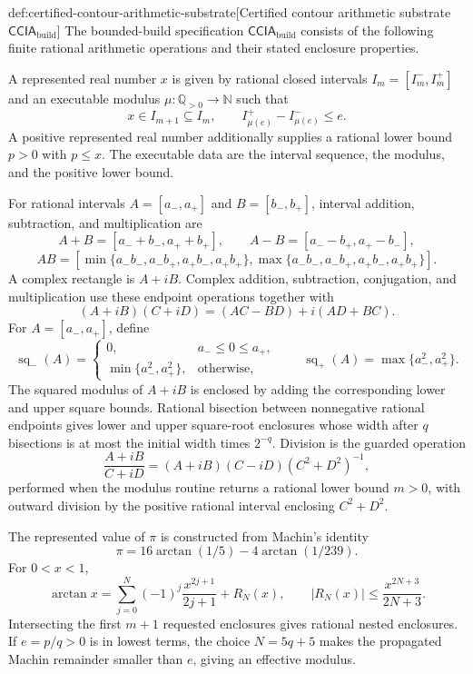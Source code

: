 \documentclass[11pt]{article}
\begin{document}
\begin{definitionv}{def:certified-contour-arithmetic-substrate}[Certified contour arithmetic substrate \(\mathsf{CCIA}_{\mathrm{build}}\)]
The bounded-build specification \(\mathsf{CCIA}_{\mathrm{build}}\) consists of the following finite rational arithmetic operations and their stated enclosure properties.

A represented real number \(x\) is given by rational closed intervals \(I_m=[I_m^-,I_m^+]\) and an executable modulus \(\mu:\mathbb Q_{>0}\to\mathbb N\) such that
\[
x\in I_{m+1}\subseteq I_m,
\qquad
I_{\mu(e)}^+-I_{\mu(e)}^-\le e .
\]
A positive represented real number additionally supplies a rational lower bound \(p>0\) with \(p\le x\). The executable data are the interval sequence, the modulus, and the positive lower bound.

For rational intervals \(A=[a_-,a_+]\) and \(B=[b_-,b_+]\), interval addition, subtraction, and multiplication are
\[
A+B=[a_-+b_-,a_++b_+],
\qquad
A-B=[a_--b_+,a_+-b_-],
\]
\[
AB=
\left[
\min\{a_-b_-,a_-b_+,a_+b_-,a_+b_+\},
\max\{a_-b_-,a_-b_+,a_+b_-,a_+b_+\}
\right].
\]
A complex rectangle is \(A+iB\). Complex addition, subtraction, conjugation, and multiplication use these endpoint operations together with
\[
(A+iB)(C+iD)=(AC-BD)+i(AD+BC).
\]
For \(A=[a_-,a_+]\), define
\[
\operatorname{sq}_{-}(A)=
\begin{cases}
0,&a_-\le0\le a_+,\\
\min\{a_-^2,a_+^2\},&\text{otherwise},
\end{cases}
\qquad
\operatorname{sq}_{+}(A)=\max\{a_-^2,a_+^2\}.
\]
The squared modulus of \(A+iB\) is enclosed by adding the corresponding lower and upper square bounds. Rational bisection between nonnegative rational endpoints gives lower and upper square-root enclosures whose width after \(q\) bisections is at most the initial width times \(2^{-q}\). Division is the guarded operation
\[
\frac{A+iB}{C+iD}
=(A+iB)(C-iD)(C^2+D^2)^{-1},
\]
performed when the modulus routine returns a rational lower bound \(m>0\), with outward division by the positive rational interval enclosing \(C^2+D^2\).

The represented value of \(\pi\) is constructed from Machin's identity
\[
\pi=16\arctan(1/5)-4\arctan(1/239).
\]
For \(0<x<1\),
\[
\arctan x=\sum_{j=0}^{N}(-1)^j\frac{x^{2j+1}}{2j+1}+R_N(x),
\qquad
|R_N(x)|\le\frac{x^{2N+3}}{2N+3}.
\]
Intersecting the first \(m+1\) requested enclosures gives rational nested enclosures. If \(e=p/q>0\) is in lowest terms, the choice \(N=5q+5\) makes the propagated Machin remainder smaller than \(e\), giving an effective modulus.


\end{definitionv}
\end{document}
